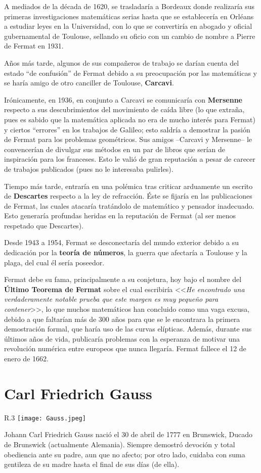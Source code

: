 \documentclass[11pt,oneside]{book}
\begin{document}
A mediados de la década de 1620, se trasladaría a Bordeaux donde realizaría sus primeras investigaciones matemáticas serias hasta que se establecería en Orléans a estudiar leyes en la Universidad, con lo que se convertiría en abogado y oficial gubernamental de Toulouse, sellando su oficio con un cambio de nombre a Pierre de Fermat en 1931.

Años más tarde, algunos de sus compañeros de trabajo se darían cuenta del estado ``de confusión'' de Fermat debido a su preocupación por las matemáticas y se haría amigo de otro canciller de Toulouse, \textbf{Carcavi}.

Irónicamente, en 1936, en conjunto a Carcavi se comunicaría con \textbf{Mersenne} respecto a sus descubrimientos del movimiento de caída libre (lo que extraña, pues es sabido que la matemática aplicada no era de mucho interés para Fermat) y ciertos ``errores'' en los trabajos de Galileo; esto saldría a demostrar la pasión de Fermat para los problemas geométricos. Sus amigos --Carcavi y Mersenne-- le convencerían de divulgar sus métodos en un par de libros que serían de inspiración para los franceses. Esto le valió de gran reputación a pesar de carecer de trabajos publicados (pues no le interesaba pulirles).

Tiempo más tarde, entraría en una polémica tras criticar arduamente un escrito de \textbf{Descartes} respecto a la ley de refracción. Éste se fijaría en las publicaciones de Fermat, las cuales atacaría tratándolo de matemático y pensador inadecuado. Esto generaría profundas heridas en la reputación de Fermat (al ser menos respetado que Descartes).

Desde 1943 a 1954, Fermat se desconectaría del mundo exterior debido a su dedicación por la \textbf{teoría de números}, la guerra que afectaría a Toulouse y la plaga, del cual él sería poseedor.

Fermat debe su fama, principalmente a su conjetura, hoy bajo el nombre del \textbf{Último Teorema de Fermat} sobre el cual escribiría <<\textit{He encontrado una verdaderamente notable prueba que este margen es muy pequeño para contener}>>, lo que muchos matemáticos han concluido como una vaga excusa, debido a que faltarían más de 300 años para que se le encontrara la primera demostración formal, que haría uso de las curvas elípticas. Además, durante sus últimos años de vida, publicaría problemas con la esperanza de motivar una revolución numérica entre europeos que nunca llegaría. Fermat fallece el 12 de enero de 1662.

\section{Carl Friedrich Gauss}
\begin{wrapfigure}{R}{.3\textwidth}
\texttt{[image: Gauss.jpeg]}
\caption{}
\end{wrapfigure}
Johann Carl Friedrich Gauss nació el 30 de abril de 1777 en Brunswick, Ducado de Brunswick (actualmente Alemania). Siempre demostró devoción y total obediencia ante su padre, aun que no afecto; por otro lado, cuidaba con suma gentileza de su madre hasta el final de sus días (de ella).
\end{document}
